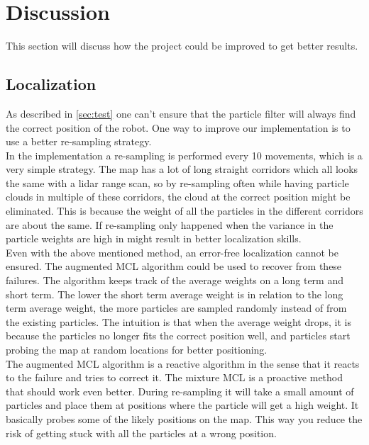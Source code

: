 
\section{Discussion} %
\label{sec:discussion}

This section will discuss how the project could be improved to get better results.\\

\subsection{Localization}
As described in \autoref{sec:test} one can't ensure that the particle filter will always find the correct position of the robot. One way to improve our implementation is to use a better re-sampling strategy.\\

In the implementation a re-sampling is performed every 10 movements, which is a very simple strategy. The map has a lot of long straight corridors which all looks the same with a lidar range scan, so by re-sampling often while having particle clouds in multiple of these corridors, the cloud at the correct position might be eliminated. This is because the weight of all the particles in the different corridors are about the same. If re-sampling only happened when the variance in the particle weights are high in might result in better localization skills. \\

Even with the above mentioned method, an error-free localization cannot be ensured. The augmented MCL algorithm could be used to recover from these failures. The algorithm keeps track of the average weights on a long term and short term. The lower the short term average weight is in relation to the long term average weight, the more particles are sampled randomly instead of from the existing particles. The intuition is that when the average weight drops, it is because the particles no longer fits the correct position well, and particles start probing the map at random locations for better positioning. \\

The augmented MCL algorithm is a reactive algorithm in the sense that it reacts to the failure and tries to correct it. The mixture MCL is a proactive method that should work even better. During re-sampling it will take a small amount of particles and place them at positions where the particle will get a high weight. It basically probes some of the likely positions on the map.
This way you reduce the risk of getting stuck with all the particles at a wrong position.\\

